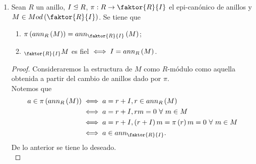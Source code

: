 \documentclass{article}
\begin{document}
\begin{enumerate}[label=\textbf{Ej \arabic*.}]
\begin{proof}
		Ahora, si $a\in R$, $(zr)\cdot m=z\cdot(r\cdot m)=z\cdot 0=0$. Por lo tanto $ann_R(M)\unlhd R$.\\
		\\
		$\displaystyle ann_{\faktor{R}{ann_R(M)}}(M)=\{r\in \faktor{R}{ann_R(M)}\,|\, [r]\cdot m=0\}$ con $[r]$ denotando la clase de $r\in R$ bajo la
		relación de equivalencia. Ahora, como $[r]\cdot m=0,$ entonces 
		\[0=(r+ann_R(M))\cdot m=r\cdot m+0,\]
		y así $r\in ann_R(M)$, es decir, $[r]=0$. Por lo tanto $M$ es un \\ $\faktor{R}{ann_R(M)}$-módulo fiel.\\
		\\
		Sean $f\in\operatorname{Hom}_R(R,M)$ y $r\in ann_R(M)$, entonces $r\cdot m=0\,\,\forall m\in M$ así, como $f$ es morfismo
		$f(r)=r\cdot f(1)=0$ pues $f(1)\in M$. Por lo tanto $ann_R(M)\leq Ker(f)$.\\
		\\
		Sea $N\in Mod(R)$ tal que existe $h\in \operatorname{Hom}_R(M,N)$ isomorfismo. Entonces para cada $n\in N$ existe un único $m\in M$
		tal que $h(m)=n$, así 
		\begin{align*}
			r\in ann_R(M) &\iff r\cdot m=0\,\,\,\forall m\in M\\
			&\iff h(r\cdot m)=0\,\,\,\forall m\in M\\
			&\iff r\cdot h(m)=0\,\,\,\forall m\in M\\
			&\iff r\cdot n=0\,\,\,\forall n\in N\\
			& \iff r\in ann_R(N).
		\end{align*}
	\end{proof}
	
	\item Sean $R$ un anillo, $I\subnormeq R$, $\pi:R\to\faktor{R}{I}$ el epi-canónico de anillos y $M\in Mod\lrprth{\faktor{R}{I}}$. Se tiene que
	\begin{enumerate}
		\item $\pi\lrprth{ann_R\lrprth{M}}=ann_{\faktor{R}{I}}\lrprth{M}$;
		\item $\ringmod{\faktor{R}{I}}{M}{l}$ es fiel $\iff I=ann_R \left(M\right)$.
	\end{enumerate}
	\begin{proof}
		Consideraremos la estructura de $M$ como $R$-módulo como aquella obtenida a partir del cambio de anillos dado por $\pi$.\\
		 Notemos que
		\begin{align*}
			a\in\pi\lrprth{ann_R\lrprth{M}}&\iff  a=r+I, r\in ann_{R}\lrprth{M}\\
			&\iff  a=r+I, rm=0\ \forall\ m\in M\\
			&\iff  a=r+I, \lrprth{r+I}m=\pi\lrprth{r}m=0\ \forall\ m\in M\\
			&\iff  a\in ann_{\faktor{R}{I}}.
		\end{align*}
		De lo anterior se tiene lo deseado.\\
		

\end{proof}
\end{enumerate}
\end{document}
